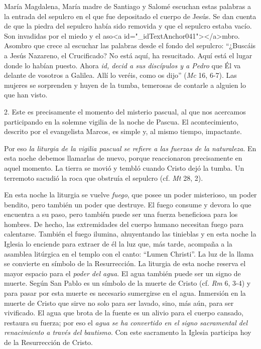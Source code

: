 			\begin{body}María Magdalena, María madre de Santiago y Salomé escuchan estas palabras a la entrada del sepulcro en el que fue depositado el cuerpo de Jesús. Se dan cuenta de que la piedra del sepulcro había sido removida y que el sepulcro estaba vacío. Son invadidas por el miedo y el aso<a id="_idTextAnchor041"></a>mbro. Asombro que crece al escuchar las palabras desde el fondo del sepulcro: “¿Buscáis a Jesús Nazareno, el Crucificado? No está aquí, ha resucitado. Aquí está el lugar donde lo habían puesto. Ahora \textit{id, decid a sus discípulos y a Pedro }que Él va delante de vosotros a Galilea. Allí lo veréis, como os dijo” (\textit{Mc} 16, 6-7). Las mujeres se sorprenden y huyen de la tumba, temerosas de contarle a alguien lo que han visto. \end{body}
			
			\begin{body}2. Este es precisamente el momento del misterio pascual, al que nos acercamos participando en la solemne vigilia de la noche de Pascua. El acontecimiento, descrito por el evangelista Marcos, es simple y, al mismo tiempo, impactante. \end{body}
			
			\begin{body}Por eso \textit{la liturgia de la vigilia pascual se refiere a las fuerzas de la naturaleza}. En esta noche debemos llamarlas de nuevo, porque reaccionaron precisamente en aquel momento. La tierra se movió y tembló cuando Cristo dejó la tumba. Un terremoto sacudió la roca que obstruía el sepulcro (cf. \textit{Mt} 28, 2). \end{body}
			
			\begin{body}En esta noche la liturgia se vuelve \textit{fuego}, que posee un poder misterioso, un poder bendito, pero también un poder que destruye. El fuego consume y devora lo que encuentra a su paso, pero también puede ser una fuerza beneficiosa para los hombres. De hecho, las extremidades del cuerpo humano necesitan fuego para calentarse. También el fuego ilumina, ahuyentando las tinieblas y en esta noche la Iglesia lo enciende para extraer de él la luz que, más tarde, acompaña a la asamblea litúrgica en el templo con el canto: “Lumen Christi”. La luz de la llama se convierte en símbolo de la Resurrección. La liturgia de esta noche reserva el mayor espacio para el\textit{ poder del agua}. El agua también puede ser un signo de muerte. Según San Pablo es un símbolo de la muerte de Cristo (cf. \textit{Rm} 6, 3-4) y para pasar por esta muerte es necesario sumergirse en el agua. Inmersión en la muerte de Cristo que sirve no solo para ser lavado, sino, más aún, para ser vivificado. El agua que brota de la fuente es un alivio para el cuerpo cansado, restaura su fuerza; por eso el \textit{agua se ha convertido en el signo sacramental del renacimiento a través del bautismo}. Con este sacramento la Iglesia participa hoy de la Resurrección de Cristo. \end{body}
			
